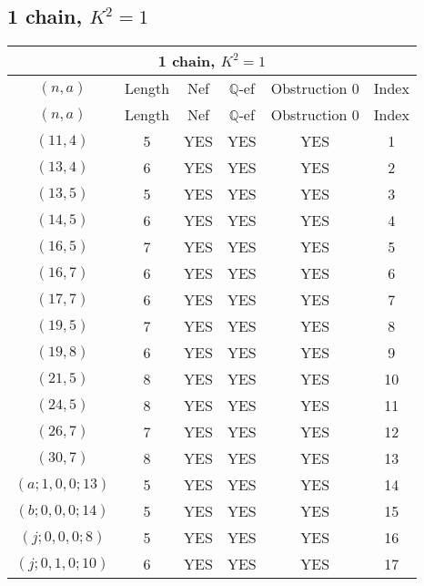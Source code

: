 \subsection{1 chain, $K^2 = 1$}
\begin{longtable}{|c|c|c|c|c|c|}
\hline
\multicolumn{6}{|c|}{1 chain, $K^2 = 1$}\\
\hline
$(n,a)$ & Length & Nef & $\mathbb Q$-ef & Obstruction 0 & Index\\
\hline
\endfirsthead

\hline
$(n,a)$ & Length & Nef & $\mathbb Q$-ef & Obstruction 0 & Index\\
\hline
\endhead
\hline
\endfoot

$(11, 4)$ & 5 & YES & YES & YES & 1\\
$(13, 4)$ & 6 & YES & YES & YES & 2\\
$(13, 5)$ & 5 & YES & YES & YES & 3\\
$(14, 5)$ & 6 & YES & YES & YES & 4\\
$(16, 5)$ & 7 & YES & YES & YES & 5\\
$(16, 7)$ & 6 & YES & YES & YES & 6\\
$(17, 7)$ & 6 & YES & YES & YES & 7\\
$(19, 5)$ & 7 & YES & YES & YES & 8\\
$(19, 8)$ & 6 & YES & YES & YES & 9\\
$(21, 5)$ & 8 & YES & YES & YES & 10\\
$(24, 5)$ & 8 & YES & YES & YES & 11\\
$(26, 7)$ & 7 & YES & YES & YES & 12\\
$(30, 7)$ & 8 & YES & YES & YES & 13\\
$(a; 1, 0, 0; 13)$ & 5 & YES & YES & YES & 14\\
$(b; 0, 0, 0; 14)$ & 5 & YES & YES & YES & 15\\
$(j; 0, 0, 0; 8)$ & 5 & YES & YES & YES & 16\\
$(j; 0, 1, 0; 10)$ & 6 & YES & YES & YES & 17
\end{longtable}
